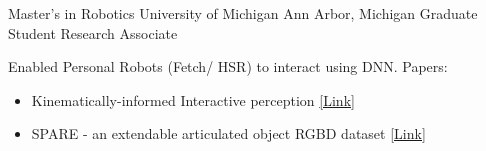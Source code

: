 

\begin{cventries2}
\cventry
{Master's in Robotics} %
{University of Michigan} %
{Ann Arbor, Michigan} %
{} %
{}
\vspace{-0.3cm}
\cventry
{Graduate Student Research Associate} %
{} %
{} %
{} %
{
	\begin{cvitems} %
\item{
	Enabled Personal Robots (Fetch/ HSR) to interact using DNN. Papers:
	\begin{itemize}
	\item {Kinematically-informed Interactive perception \href{https://arxiv.org/pdf/1901.05580}{[Link]}}
	\vspace{0.1cm}
	\item SPARE - an extendable articulated object RGBD dataset {\href{https://arxiv.org/pdf/1803.11147}{[Link]}}
	\end{itemize}
	}
	\end{cvitems}
}


\end{cventries2}
